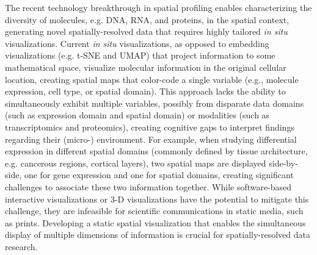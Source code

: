 \documentclass[11pt]{article}
\begin{document}
The recent technology breakthrough in spatial profiling enables characterizing the diversity of molecules, e.g. DNA, RNA, and proteins, in the spatial context\cite{moffitt_2022}, generating novel spatially-resolved data that requires highly tailored \textit{in situ} visualizations\cite{dries_2021, Lewis_2021, odonoghue_2021}. Current \textit{in situ} visualizations, as opposed to embedding visualizations (e.g. t-SNE and UMAP) that project information to some mathematical space, visualize molecular information in the original cellular location, creating spatial maps that color-code a single variable (e.g., molecule expression, cell type, or spatial domain). This approach lacks the ability to simultaneously exhibit multiple variables, possibly from disparate data domains (such as expression domain and spatial domain) or modalities (such as transcriptomics and proteomics), creating cognitive gaps to interpret findings regarding their (micro-) environment. For example, when studying differential expression in different spatial domains (commonly defined by tissue architecture, e.g. cancerous regions, cortical layers), two spatial maps are displayed side-by-side, one for gene expression and one for spatial domains, creating significant challenges to associate these two information together. While software-based interactive visualizations\cite{sriworarat_2023} or 3-D visualizations have the potential to mitigate this challenge, they are infeasible for scientific communications in static media, such as prints. Developing a static spatial visualization that enables the simultaneous display of multiple dimensions of information is crucial for spatially-resolved data research.

\end{document}
